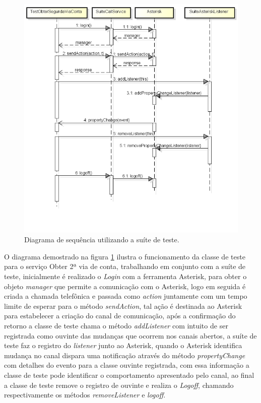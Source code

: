 \begin{figure}[H]
	\centering
	\caption{Diagrama de sequência utilizando a suíte de teste.}
	\label{figura:diagramaSeq2Via}
	\includegraphics{figuras/diagramaSequenciaObter2Via.png}
\end{figure}

O diagrama demostrado na figura \ref{figura:diagramaSeq2Via} ilustra o funcionamento da classe de teste para o serviço Obter 2ª via de conta, trabalhando em conjunto com a suíte de teste, inicialmente é realizado o \textit{Login} com a ferramenta Asterisk, para obter o objeto \textit{manager} que permite a comunicação com o Asterisk, logo em seguida é criada a chamada telefônica e passada como \textit{action} juntamente com um tempo limite de esperar para o método \textit{sendAction}, tal ação é destinada ao Asterisk para estabelecer a criação do canal de comunicação, após a confirmação do retorno a classe de teste chama o método \textit{addListener} com intuito de ser registrada como ouvinte das mudanças que ocorrem nos canais abertos, a suíte de teste faz o registro do \textit{listener} junto ao Asterisk,
quando o Asterisk identifica mudança no canal dispara uma notificação através do método \textit{propertyChange} com detalhes do evento para a classe ouvinte registrada, com essa informação a classe de teste pode identificar o comportamento apresentado pelo canal, ao final a classe de teste remove o registro de ouvinte e realiza o \textit{Logoff}, chamando respectivamente os métodos \textit{removeListener} e \textit{logoff}.



